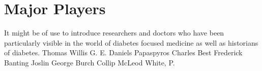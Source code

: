 \documentclass[12pt]{article}
\begin{document}
\begin{enumerate}


\end{enumerate}


\newpage
\section{Major Players}
It might be of use to introduce researchers and doctors who have been particularly visible in the world of diabetes focused medicine as well as historians of diabetes. 
Thomas Willis
G. E. Daniels
Papaspyros
Charles Best
Frederick Banting
Joslin
George Burch
Collip
McLeod
White, P. 


\newpage
\singlespacing


\end{document}
